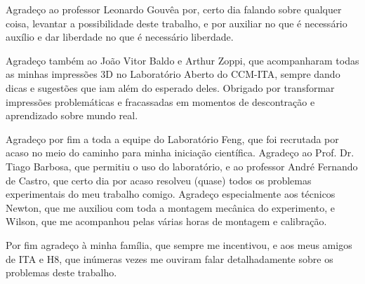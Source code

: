 Agradeço ao professor Leonardo Gouvêa por, certo dia falando sobre qualquer coisa, levantar a possibilidade deste trabalho, e por auxiliar no que é necessário auxílio e dar liberdade no que é necessário liberdade.

Agradeço também ao João Vitor Baldo e Arthur Zoppi, que acompanharam todas as minhas impressões 3D no Laboratório Aberto do CCM-ITA, sempre dando dicas e sugestões que iam além do esperado deles. Obrigado por transformar impressões problemáticas e fracassadas em momentos de descontração e aprendizado sobre mundo real.

Agradeço por fim a toda a equipe do Laboratório Feng, que foi recrutada por acaso no meio do caminho para minha iniciação científica. Agradeço ao Prof. Dr. Tiago Barbosa, que permitiu o uso do laboratório, e ao professor André Fernando de Castro, que certo dia por acaso resolveu (quase) todos os problemas experimentais do meu trabalho comigo. Agradeço especialmente aos técnicos Newton, que me auxiliou com toda a montagem mecânica do experimento, e Wilson, que me acompanhou pelas várias horas de montagem e calibração.

Por fim agradeço à minha família, que sempre me incentivou, e aos meus amigos de ITA e H8, que inúmeras vezes me ouviram falar detalhadamente sobre os problemas deste trabalho.